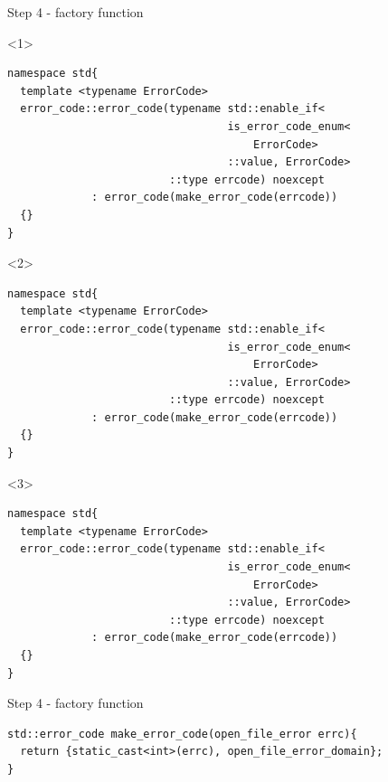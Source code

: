 \documentclass[10pt]{beamer}
\begin{document}
\begin{frame}[fragile]{Step 4 - factory function}
	\begin{onlyenv}
	\begin{verbatim}
namespace std{
  template <typename ErrorCode>
  error_code::error_code(typename std::enable_if<
                                  is_error_code_enum<
                                      ErrorCode>
                                  ::value, ErrorCode>
                         ::type errcode) noexcept 
             : error_code(make_error_code(errcode))
  {}
}
	\end{verbatim}
	\end{onlyenv}

	\begin{onlyenv}
	\begin{verbatim}
namespace std{
  template <typename ErrorCode>
  error_code::error_code(typename std::enable_if<
                                  is_error_code_enum<
                                      ErrorCode>
                                  ::value, ErrorCode>
                         ::type errcode) noexcept 
             : error_code(make_error_code(errcode))
  {}
}
	\end{verbatim}
	\end{onlyenv}
	
	\begin{onlyenv}
	\begin{verbatim}
namespace std{
  template <typename ErrorCode>
  error_code::error_code(typename std::enable_if<
                                  is_error_code_enum<
                                      ErrorCode>
                                  ::value, ErrorCode>
                         ::type errcode) noexcept 
             : error_code(make_error_code(errcode))
  {}
}
	\end{verbatim}
	\end{onlyenv}

\end{frame}

\begin{frame}[fragile]{Step 4 - factory function}
	\begin{verbatim}
std::error_code make_error_code(open_file_error errc){
  return {static_cast<int>(errc), open_file_error_domain};
}
	\end{verbatim}
\end{frame}
\end{document}
